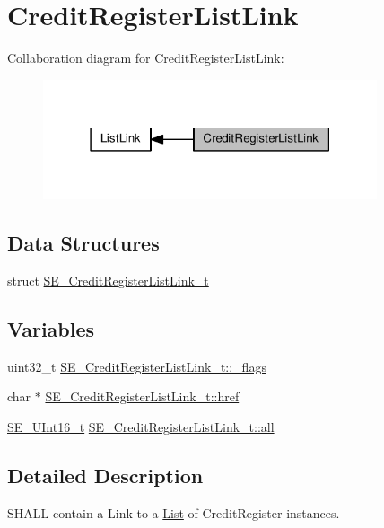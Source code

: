 \hypertarget{group__CreditRegisterListLink}{}\section{Credit\+Register\+List\+Link}
\label{group__CreditRegisterListLink}
Collaboration diagram for Credit\+Register\+List\+Link\+:\nopagebreak
\begin{figure}[H]
\begin{center}
\leavevmode
\includegraphics[width=279pt]{group__CreditRegisterListLink}
\end{center}
\end{figure}
\subsection*{Data Structures}
\begin{DoxyCompactItemize}
\item 
struct \hyperlink{structSE__CreditRegisterListLink__t}{S\+E\+\_\+\+Credit\+Register\+List\+Link\+\_\+t}
\end{DoxyCompactItemize}
\subsection*{Variables}
\begin{DoxyCompactItemize}
\item 
uint32\+\_\+t \hyperlink{group__CreditRegisterListLink_ga69524ed9bcb30aa661753e0db081fe05}{S\+E\+\_\+\+Credit\+Register\+List\+Link\+\_\+t\+::\+\_\+flags}
\item 
char $\ast$ \hyperlink{group__CreditRegisterListLink_ga95b64e9f140f59d8166045d43026c5e0}{S\+E\+\_\+\+Credit\+Register\+List\+Link\+\_\+t\+::href}
\item 
\hyperlink{group__UInt16_gac68d541f189538bfd30cfaa712d20d29}{S\+E\+\_\+\+U\+Int16\+\_\+t} \hyperlink{group__CreditRegisterListLink_gaef19d5848be3a43aac4590b88bcb8b45}{S\+E\+\_\+\+Credit\+Register\+List\+Link\+\_\+t\+::all}
\end{DoxyCompactItemize}


\subsection{Detailed Description}
S\+H\+A\+LL contain a Link to a \hyperlink{structList}{List} of Credit\+Register instances. 

